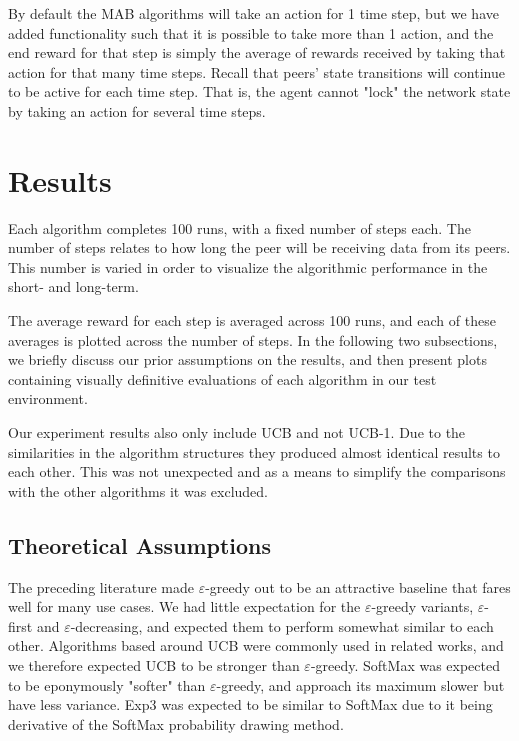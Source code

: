 \documentclass{article}
\begin{document}
By default the MAB algorithms will take an action for 1 time step, but we have added functionality such that it is possible to take more than 1 action, and the end reward 
for that step is simply the average of rewards received by taking that action for that many time steps. Recall that peers' state transitions will continue to be active 
for each time step. That is, the agent cannot "lock" the network state by taking an action for several time steps. 

\section{Results}
Each algorithm completes 100 runs, with a fixed number of steps each. The number of steps relates to how long the peer will be receiving data from its peers. This number is 
varied in order to visualize the algorithmic performance in the short- and long-term. 

The average reward for each step is averaged across 100 runs, and each of these averages is plotted across the number of steps. In the following two subsections, we briefly 
discuss our prior assumptions on the results, and then present plots containing visually definitive evaluations of each algorithm in our test environment.

Our experiment results also only include UCB and not UCB-1. Due to the similarities in the algorithm structures they produced almost identical results to each other. 
This was not unexpected and as a means to simplify the comparisons with the other algorithms it was excluded. 

\subsection{Theoretical Assumptions} 
The preceding literature made $\varepsilon$-greedy out to be an attractive baseline that fares well for many use cases. We had little expectation for the $\varepsilon$-greedy 
variants, $\varepsilon$-first and $\varepsilon$-decreasing, and expected them to perform somewhat similar to each other. Algorithms based around UCB were commonly used in related works, 
and we therefore expected UCB to be stronger than $\varepsilon$-greedy. SoftMax was expected to be eponymously "softer" than $\varepsilon$-greedy, and approach its maximum 
slower but have less variance. Exp3 was expected to be similar to SoftMax due to it being derivative of the SoftMax probability drawing method.
\end{document}
